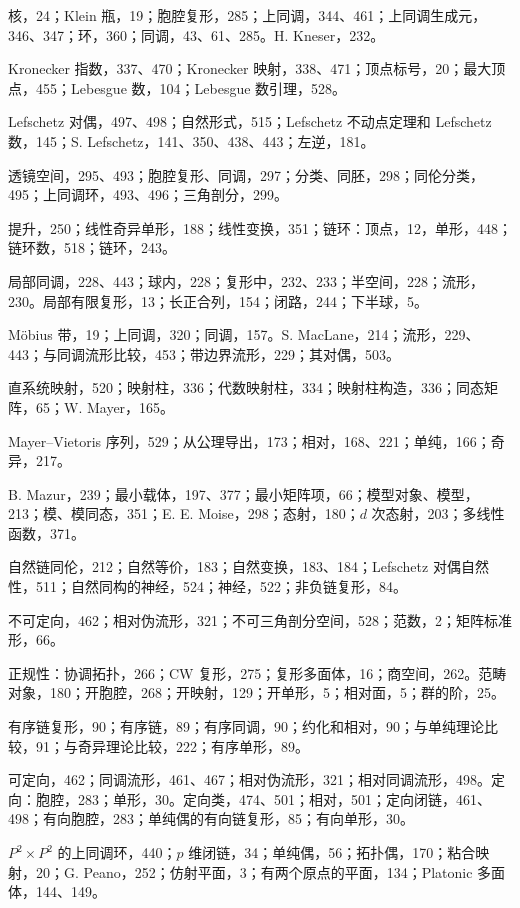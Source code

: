 核，24；Klein 瓶，19；胞腔复形，285；上同调，344、461；上同调生成元，346、347；环，360；同调，43、61、285。H. Kneser，232。

Kronecker 指数，337、470；Kronecker 映射，338、471；顶点标号，20；最大顶点，455；Lebesgue 数，104；Lebesgue 数引理，528。

Lefschetz 对偶，497、498；自然形式，515；Lefschetz 不动点定理和 Lefschetz 数，145；S. Lefschetz，141、350、438、443；左逆，181。

透镜空间，295、493；胞腔复形、同调，297；分类、同胚，298；同伦分类，495；上同调环，493、496；三角剖分，299。

提升，250；线性奇异单形，188；线性变换，351；链环：顶点，12，单形，448；链环数，518；链环，243。

局部同调，228、443；球内，228；复形中，232、233；半空间，228；流形，230。局部有限复形，13；长正合列，154；闭路，244；下半球，5。

Möbius 带，19；上同调，320；同调，157。S. MacLane，214；流形，229、443；与同调流形比较，453；带边界流形，229；其对偶，503。

直系统映射，520；映射柱，336；代数映射柱，334；映射柱构造，336；同态矩阵，65；W. Mayer，165。

Mayer--Vietoris 序列，529；从公理导出，173；相对，168、221；单纯，166；奇异，217。

B. Mazur，239；最小载体，197、377；最小矩阵项，66；模型对象、模型，213；模、模同态，351；E. E. Moise，298；态射，180；$d$ 次态射，203；多线性函数，371。

自然链同伦，212；自然等价，183；自然变换，183、184；Lefschetz 对偶自然性，511；自然同构的神经，524；神经，522；非负链复形，84。

不可定向，462；相对伪流形，321；不可三角剖分空间，528；范数，2；矩阵标准形，66。

正规性：协调拓扑，266；CW 复形，275；复形多面体，16；商空间，262。范畴对象，180；开胞腔，268；开映射，129；开单形，5；相对面，5；群的阶，25。

有序链复形，90；有序链，89；有序同调，90；约化和相对，90；与单纯理论比较，91；与奇异理论比较，222；有序单形，89。

可定向，462；同调流形，461、467；相对伪流形，321；相对同调流形，498。定向：胞腔，283；单形，30。定向类，474、501；相对，501；定向闭链，461、498；有向胞腔，283；单纯偶的有向链复形，85；有向单形，30。

$P^2\times P^2$ 的上同调环，440；$p$ 维闭链，34；单纯偶，56；拓扑偶，170；粘合映射，20；G. Peano，252；仿射平面，3；有两个原点的平面，134；Platonic 多面体，144、149。

